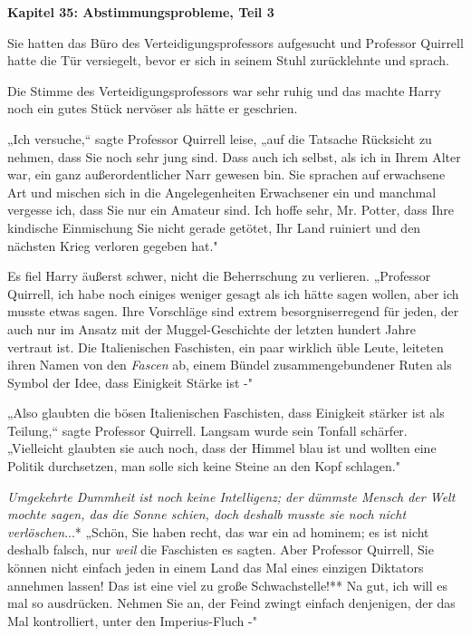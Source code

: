 

\hypertarget{abstimmungsprobleme-teil-3}{%

\textbf{Kapitel 35: Abstimmungsprobleme, Teil 3}

Sie hatten das Büro des Verteidigungsprofessors aufgesucht und Professor Quirrell hatte die Tür versiegelt, bevor er sich in seinem Stuhl zurücklehnte und sprach.

Die Stimme des Verteidigungsprofessors war sehr ruhig und das machte Harry noch ein gutes Stück nervöser als hätte er geschrien.

„Ich versuche,“ sagte Professor Quirrell leise, „auf die Tatsache Rücksicht zu nehmen, dass Sie noch sehr jung sind. Dass auch ich selbst, als ich in Ihrem Alter war, ein ganz außerordentlicher Narr gewesen bin. Sie sprachen auf erwachsene Art und mischen sich in die Angelegenheiten Erwachsener ein und manchmal vergesse ich, dass Sie nur ein Amateur sind. Ich hoffe sehr, Mr. Potter, dass Ihre kindische Einmischung Sie nicht gerade getötet, Ihr Land ruiniert und den nächsten Krieg verloren gegeben hat."

Es fiel Harry äußerst schwer, nicht die Beherrschung zu verlieren. „Professor Quirrell, ich habe noch einiges weniger gesagt als ich hätte sagen wollen, aber ich musste etwas sagen. Ihre Vorschläge sind extrem besorgniserregend für jeden, der auch nur im Ansatz mit der Muggel-Geschichte der letzten hundert Jahre vertraut ist. Die Italienischen Faschisten, ein paar wirklich üble Leute, leiteten ihren Namen von den \emph{Fascen} ab, einem Bündel zusammengebundener Ruten als Symbol der Idee, dass Einigkeit Stärke ist -"

„Also glaubten die bösen Italienischen Faschisten, dass Einigkeit stärker ist als Teilung,“ sagte Professor Quirrell. Langsam wurde sein Tonfall schärfer. „Vielleicht glaubten sie auch noch, dass der Himmel blau ist und wollten eine Politik durchsetzen, man solle sich keine Steine an den Kopf schlagen."

\emph{Umgekehrte Dummheit ist noch keine Intelligenz; der dümmste Mensch der Welt mochte sagen, das die Sonne schien, doch deshalb musste sie noch nicht verlöschen}...* „Schön, Sie haben recht, das war ein ad hominem; es ist nicht deshalb falsch, nur \emph{weil} die Faschisten es sagten. Aber Professor Quirrell, Sie können nicht einfach jeden in einem Land das Mal eines einzigen Diktators annehmen lassen! Das ist eine viel zu große Schwachstelle!** Na gut, ich will es mal so ausdrücken. Nehmen Sie an, der Feind zwingt einfach denjenigen, der das Mal kontrolliert, unter den Imperius-Fluch -"

}
